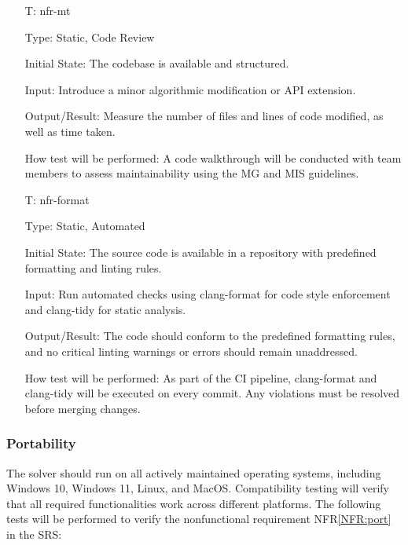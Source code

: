 \documentclass[12pt, titlepage]{article}
\newcounter{testnum} %
\newcommand{\nfrref}[1]{NFR\ref{#1}}
\begin{document}
\begin{itemize}

\item[T\refstepcounter{testnum}\thetestnum \label{T:mt}:]{nfr-mt}

Type: Static, Code Review

Initial State: The codebase is available and structured.

Input: Introduce a minor algorithmic modification or API extension.

Output/Result: Measure the number of files and lines of code modified, as well
as time taken.

How test will be performed: A code walkthrough will be conducted with team
members to assess maintainability using the MG and MIS guidelines.


\item[T\refstepcounter{testnum}\thetestnum \label{T:fmt}:]{nfr-format}

Type: Static, Automated

Initial State: The source code is available in a repository with predefined
formatting and linting rules.

Input: Run automated checks using clang-format for code style enforcement and
clang-tidy for static analysis.

Output/Result: The code should conform to the predefined formatting rules, and
no critical linting warnings or errors should remain unaddressed.

How test will be performed: As part of the CI pipeline, clang-format and
clang-tidy will be executed on every commit. Any violations must be resolved
before merging changes.

\end{itemize}

\subsubsection{Portability}

The solver should run on all actively maintained operating systems, including
Windows 10, Windows 11, Linux, and MacOS. Compatibility testing will verify that
all required functionalities work across different platforms. The following
tests will be performed to verify the nonfunctional requirement \nfrref{NFR:port}
in the SRS:
\end{document}
